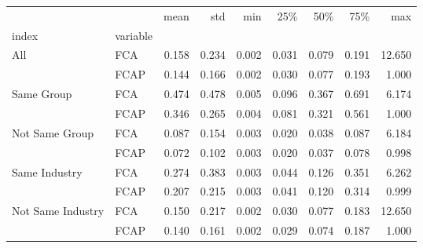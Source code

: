 \begin{tabular}{llrrrrrrr}
\toprule
                  &      &   mean &    std &    min &    25\% &    50\% &    75\% &     max \\
index & variable &        &        &        &        &        &        &         \\
\midrule
All & FCA &  0.158 &  0.234 &  0.002 &  0.031 &  0.079 &  0.191 &  12.650 \\
                  & FCAP &  0.144 &  0.166 &  0.002 &  0.030 &  0.077 &  0.193 &   1.000 \\
Same Group & FCA &  0.474 &  0.478 &  0.005 &  0.096 &  0.367 &  0.691 &   6.174 \\
                  & FCAP &  0.346 &  0.265 &  0.004 &  0.081 &  0.321 &  0.561 &   1.000 \\
Not Same Group & FCA &  0.087 &  0.154 &  0.003 &  0.020 &  0.038 &  0.087 &   6.184 \\
                  & FCAP &  0.072 &  0.102 &  0.003 &  0.020 &  0.037 &  0.078 &   0.998 \\
Same Industry & FCA &  0.274 &  0.383 &  0.003 &  0.044 &  0.126 &  0.351 &   6.262 \\
                  & FCAP &  0.207 &  0.215 &  0.003 &  0.041 &  0.120 &  0.314 &   0.999 \\
Not Same Industry & FCA &  0.150 &  0.217 &  0.002 &  0.030 &  0.077 &  0.183 &  12.650 \\
                  & FCAP &  0.140 &  0.161 &  0.002 &  0.029 &  0.074 &  0.187 &   1.000 \\
\bottomrule
\end{tabular}
